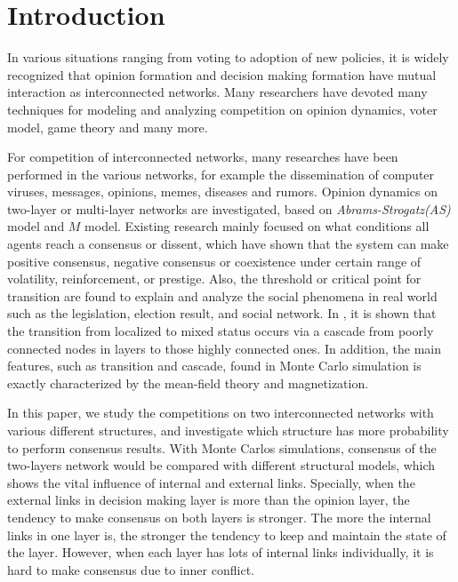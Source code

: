 \documentclass[english]{cccconf}
\begin{document}
\section{Introduction}
In various situations ranging from voting to adoption of new policies, it is widely recognized that opinion formation and decision making formation have mutual interaction as interconnected networks\cite{bianconi2018,domenico2013,tomasini2015, kimsangwoo2012,newman2010,boccaletti2014,mikko2013,huberman2004}. Many researchers have devoted many techniques for modeling and analyzing competition on opinion dynamics\cite{amato2017,quattrociocchi2014,haibo2017, hua2014}, voter model\cite{redner2017}, game theory\cite{smyrnakis2019} and many more\cite{danziger2019,namkhanhvu2017,laguna2004,masuda2015,zuev2012, shenyu2018}.  
 
For competition of interconnected networks, many researches have been performed in the various networks, for example the dissemination of computer viruses, messages, opinions, memes, diseases and rumors\cite{hua2014,shenyu2018,alvarez2016,gomez2015,diep2017,rocca2014,velasquez2018}. Opinion dynamics on two-layer or multi-layer networks are investigated, based on \textit{Abrams-Strogatz(AS)} model\cite{abrams2003,vazquez2010} and $M$ model\cite{rocca2014}. Existing research mainly focused on what conditions all agents reach a consensus or dissent, which have shown that the system can make positive consensus, negative consensus or coexistence under certain range of volatility, reinforcement, or prestige. Also, the threshold or critical point for transition are found to explain and analyze the social phenomena in real world such as the legislation, election result, and social network\cite{alvarez2016, amato2017, diep2017}. In \cite{gomez2015}, it is shown that the transition from localized to mixed status occurs via a cascade from poorly connected nodes in layers to those highly connected ones. In addition, the main features, such as transition and cascade, found in Monte Carlo simulation is exactly characterized by the mean-field theory and magnetization\cite{alvarez2016, diep2017, amato2017, gomez2015}.   

In this paper, we study the competitions on two interconnected networks with various different structures, and investigate which structure has more probability to perform consensus results. With Monte Carlos simulations, consensus of the two-layers network would be compared with different structural models, which shows the vital influence of internal and external links. Specially, when the external links in decision making layer is more than the opinion layer, the tendency to make consensus on both layers is stronger. The more the internal links in one layer is, the stronger the tendency to keep and maintain the state of the layer. However, when each layer has lots of internal links individually, it is hard to make consensus due to inner conflict.    
\end{document}
